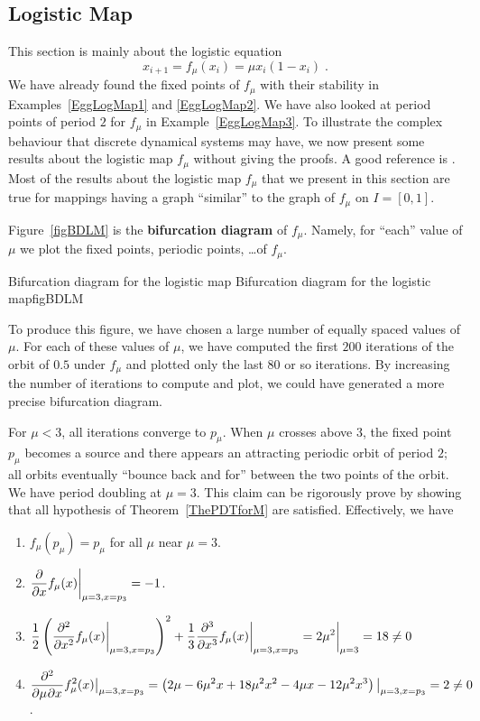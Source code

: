 \subsection{Logistic Map}

This section is mainly about the logistic equation
\[
x_{i+1} = f_\mu(x_i) = \mu x_i (1-x_i) \; .
\]
We have already found the fixed points of $f_\mu$ with their stability
in Examples~\ref{EggLogMap1} and \ref{EggLogMap2}.  We have also
looked at period points of period $2$ for $f_\mu$ in
Example~\ref{EggLogMap3}.  To illustrate the complex behaviour that
discrete dynamical systems may have, we now present some results
about the logistic map $f_\mu$ without giving the proofs.  A good
reference is \cite{D}.  Most of the results about the logistic map
$f_\mu$ that we present in this section are true for mappings having a
graph ``similar'' to the graph of $f_\mu$ on $I=[0,1]$.

Figure~\ref{figBDLM} is the
{\bfseries bifurcation diagram} of
$f_\mu$.  Namely, for ``each'' value of $\mu$ we plot the fixed
points, periodic points, \ldots of $f_\mu$.

{Bifurcation diagram for the logistic map}
{Bifurcation diagram for the logistic map}{figBDLM}

To produce this figure, we have chosen a large number
of equally spaced values of $\mu$.  For each of these values of $\mu$,
we have computed the first $200$ iterations of the orbit of $0.5$
under $f_\mu$ and plotted only the last $80$ or so iterations.  By
increasing the number of iterations to compute and plot, we could have
generated a more precise bifurcation diagram.

For $\mu<3$, all iterations converge to $p_\mu$.   When
$\mu$ crosses above $3$, the fixed point $p_\mu$ becomes a
source and there appears an attracting  periodic orbit of period $2$;
all orbits eventually ``bounce back and for'' between the two
points of the orbit.  We have period doubling at $\mu=3$.  This claim
can be rigorously prove by showing that all hypothesis of
Theorem~\ref{ThePDTforM} are satisfied.  Effectively, we have
\begin{enumerate}
\item $f_\mu(p_\mu) = p_\mu$ for all $\mu$ near $\mu=3$.
\item $\displaystyle \pdfdx{f_\mu(x)}{x} \bigg|_{\mu=3,x=p_3} = -1$.
\item
$\displaystyle \frac{1}{2}
\left(\pdfdxn{f_{\mu}(x)}{x}{2}\bigg|_{\mu=3,x=p_3}\right)^2
+\frac{1}{3} \pdfdxn{f_{\mu}(x)}{x}{3}\bigg|_{\mu=3,x=p_3}
= 2\mu^2 \bigg|_{\mu=3} = 18 \neq 0$
\item $\displaystyle \pdfdxnm{f_\mu^2(x) }{\mu}{x}{2}{}{}\big|_{\mu=3,x=p_3} =
\left( 2\mu - 6\mu^2 x+18\mu^2 x^2 - 4\mu x -
12\mu^2 x^3\right)\big|_{\mu=3,x=p_3}
= 2 \not=0$.
\end{enumerate}

